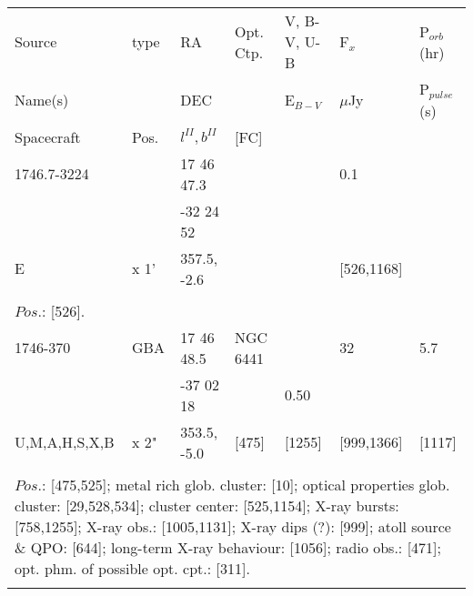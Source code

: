 \documentclass{aa}
\begin{document}
\begin{tabular}{p{2.5cm}p{1cm}p{1.8cm}p{2.3cm}p{3.3cm}p{2.0cm}p{2.2cm}}
\noalign{\smallskip}
\multicolumn{7}{p{17.5cm}}{Table 1.  (continued) }\\        
\hline
\noalign{\smallskip}
Source         & type  & RA                       &  Opt. Ctp. & V, B-V, U-B  & F$_{x}$          & P$_{orb}$(hr)    \\
Name(s)       &            & DEC                    &                     & E$_{B-V}$   & $\mu$Jy        & P$_{pulse}$(s) \\
Spacecraft & Pos.  & $l^{II}, b^{II}$      &  [FC]           &                        &                         &                             \\
\noalign{\smallskip} 
\hline

\noalign{\smallskip}
1746.7-3224   &                    & 17 46 47.3            &                     &                         & 0.1                 &       \\
                          &                    & -32 24 52             &                     &                         &                        &      \\
E                       & x 1'             & 357.5, -2.6           &                      &                        & [526,1168]    &       \\
\\
\multicolumn{7}{p{17.5cm}}{
$Pos$.: [526].}\\
\noalign{\smallskip}
\hline

\noalign{\smallskip}
1746-370             & GBA              & 17 46 48.5            & NGC 6441            &                              & 32                      & 5.7        \\
                              &                        & -37 02 18              &                                 & 0.50                     &                           &                \\
U,M,A,H,S,X,B   & x 2"                & 353.5, -5.0            & [475]                      &  [1255]                 & [999,1366]       & [1117]   \\
\\
\multicolumn{7}{p{17.5cm}}{
$Pos$.: [475,525]; metal rich glob. cluster: [10]; optical properties glob. cluster: [29,528,534]; cluster center: [525,1154]; 
X-ray bursts: [758,1255]; X-ray obs.: [1005,1131]; X-ray dips (?): [999]; atoll source \& QPO: [644]; long-term X-ray 
behaviour: [1056]; radio obs.: [471]; opt. phm. of possible opt. cpt.: [311].}\\
\noalign{\smallskip}
\hline


\end{tabular}
\end{document}
